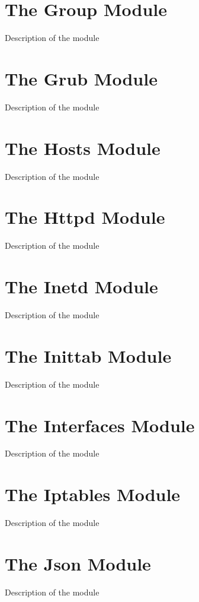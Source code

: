 \section{The Group Module}

Description of the module

\section{The Grub Module}

Description of the module

\section{The Hosts Module}

Description of the module

\section{The Httpd Module}

Description of the module

\section{The Inetd Module}

Description of the module

\section{The Inittab Module}

Description of the module

\section{The Interfaces Module}

Description of the module

\section{The Iptables Module}

Description of the module

\section{The Json Module}

Description of the module

